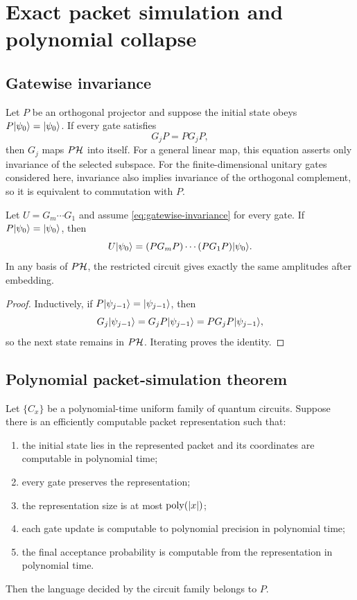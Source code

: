\chapter{Exact packet simulation and polynomial collapse}
\label{ch:exact-simulation}

\section{Gatewise invariance}
Let $P$ be an orthogonal projector and suppose the initial state obeys $P\lvert \psi_0\rangle=\lvert \psi_0\rangle$. If every gate satisfies
\begin{equation}
G_jP=PG_jP,
\label{eq:gatewise-invariance}
\end{equation}
then $G_j$ maps $P\mathcal H$ into itself. For a general linear map, this equation asserts only invariance of the selected subspace. For the finite-dimensional unitary gates considered here, invariance also implies invariance of the orthogonal complement, so it is equivalent to commutation with $P$.

\begin{theorem}
\label{thm:invariant-basis}
Let $U=G_m\cdots G_1$ and assume \cref{eq:gatewise-invariance} for every gate. If $P\lvert \psi_0\rangle=\lvert \psi_0\rangle$, then
\[
U\lvert \psi_0\rangle
=
(PG_mP)\cdots(PG_1P)\lvert \psi_0\rangle.
\]
In any basis of $P\mathcal H$, the restricted circuit gives exactly the same amplitudes after embedding.
\end{theorem}

\begin{proof}
Inductively, if $P\lvert \psi_{j-1}\rangle=\lvert \psi_{j-1}\rangle$, then
\[
G_j\lvert \psi_{j-1}\rangle
=
G_jP\lvert \psi_{j-1}\rangle
=
PG_jP\lvert \psi_{j-1}\rangle,
\]
so the next state remains in $P\mathcal H$. Iterating proves the identity.
\end{proof}

\section{Polynomial packet-simulation theorem}
\begin{theorem}
\label{thm:poly-packet}
Let $\{C_x\}$ be a polynomial-time uniform family of quantum circuits. Suppose there is an efficiently computable packet representation such that:

\begin{enumerate}
\item the initial state lies in the represented packet and its coordinates are computable in polynomial time;
\item every gate preserves the representation;
\item the representation size is at most $\operatorname{poly}(|x|)$;
\item each gate update is computable to polynomial precision in polynomial time;
\item the final acceptance probability is computable from the representation in polynomial time.
\end{enumerate}

Then the language decided by the circuit family belongs to $P$.
\end{theorem}

